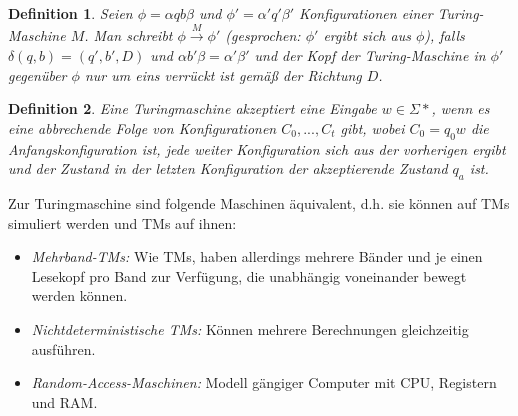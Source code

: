 \documentclass{cheat-sheet}
\newtheorem*{definition}{Definition}
\begin{document}
\begin{definition}
Seien $\phi = \alpha q b \beta$ und $\phi' = \alpha ' q' \beta '$ Konfigurationen einer Turing-Maschine $M$. Man schreibt $\phi \xrightarrow{M} \phi'$ (gesprochen: $\phi'$ ergibt sich aus $\phi$), falls $\delta(q, b) = (q', b', D)$ und $\alpha b' \beta = \alpha' \beta'$ und der Kopf der Turing-Maschine in $\phi'$ gegenüber $\phi$ nur um eins verrückt ist gemäß der Richtung $D$.
\end{definition}

\begin{definition}
Eine Turingmaschine \emph{akzeptiert} eine Eingabe $w \in \Sigma*$, wenn es eine abbrechende Folge von Konfigurationen $C_{0}, ..., C_{t}$ gibt, wobei $C_{0} = q_{0}w$ die Anfangskonfiguration ist, jede weiter Konfiguration sich aus der vorherigen ergibt und der Zustand in der letzten Konfiguration der akzeptierende Zustand $q_{a}$ ist.
\end{definition}


\begin{bem}
Zur Turingmaschine sind folgende Maschinen äquivalent, d.h. sie können auf TMs simuliert werden und TMs auf ihnen:
  \begin{itemize}
    \item \emph{Mehrband-TMs:} Wie TMs, haben allerdings mehrere Bänder und je einen Lesekopf pro Band zur Verfügung, die unabhängig voneinander bewegt werden können.
    \item \emph{Nichtdeterministische TMs:} Können mehrere Berechnungen gleichzeitig ausführen.
    \item \emph{Random-Access-Maschinen:} Modell gängiger Computer mit CPU, Registern und RAM.
  \end{itemize}
\end{bem}
\end{document}
